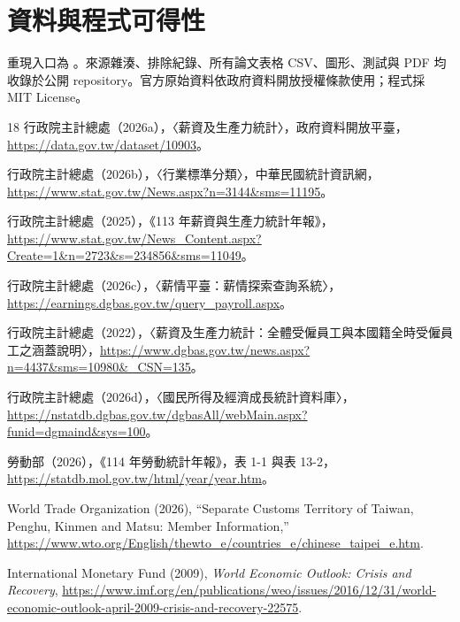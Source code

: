\documentclass[12pt]{article}
\begin{document}
\section*{資料與程式可得性}

重現入口為 。來源雜湊、排除紀錄、所有論文表格 CSV、圖形、測試與 PDF 均收錄於公開 repository。官方原始資料依政府資料開放授權條款使用；程式採 MIT License。

\begin{thebibliography}{18}
行政院主計總處（2026a），〈薪資及生產力統計〉，政府資料開放平臺，\url{https://data.gov.tw/dataset/10903}。

行政院主計總處（2026b），〈行業標準分類〉，中華民國統計資訊網，\url{https://www.stat.gov.tw/News.aspx?n=3144&sms=11195}。

行政院主計總處（2025），《113 年薪資與生產力統計年報》，\url{https://www.stat.gov.tw/News_Content.aspx?Create=1&n=2723&s=234856&sms=11049}。

行政院主計總處（2026c），〈薪情平臺：薪情探索查詢系統〉，\url{https://earnings.dgbas.gov.tw/query_payroll.aspx}。

行政院主計總處（2022），〈薪資及生產力統計：全體受僱員工與本國籍全時受僱員工之涵蓋說明〉，\url{https://www.dgbas.gov.tw/news.aspx?n=4437&sms=10980&_CSN=135}。

行政院主計總處（2026d），〈國民所得及經濟成長統計資料庫〉，\url{https://nstatdb.dgbas.gov.tw/dgbasAll/webMain.aspx?funid=dgmaind&sys=100}。

勞動部（2026），《114 年勞動統計年報》，表 1-1 與表 13-2，\url{https://statdb.mol.gov.tw/html/year/year.htm}。

World Trade Organization (2026), ``Separate Customs Territory of Taiwan, Penghu, Kinmen and Matsu: Member Information,'' \url{https://www.wto.org/English/thewto_e/countries_e/chinese_taipei_e.htm}.

International Monetary Fund (2009), \textit{World Economic Outlook: Crisis and Recovery}, \url{https://www.imf.org/en/publications/weo/issues/2016/12/31/world-economic-outlook-april-2009-crisis-and-recovery-22575}.


\end{thebibliography}
\end{document}
